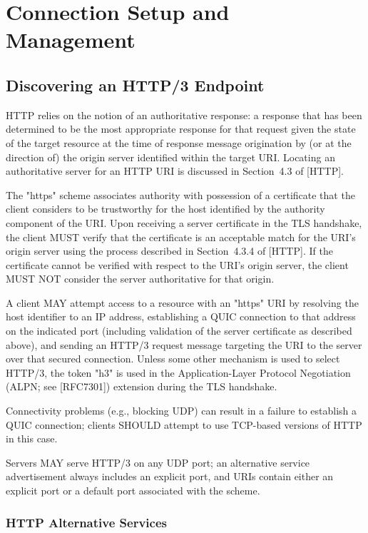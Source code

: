 \documentclass{article}
\begin{document}
\section{Connection Setup and Management}

\subsection{Discovering an HTTP/3 Endpoint}

HTTP relies on the notion of an authoritative response: a response that has been determined to be the most appropriate response for that request given the state of the target resource at the time of response message origination by (or at the direction of) the origin server identified within the target URI.  Locating an authoritative server for an HTTP URI is discussed in Section~4.3 of [HTTP].

The "https" scheme associates authority with possession of a certificate that the client considers to be trustworthy for the host identified by the authority component of the URI.  Upon receiving a server certificate in the TLS handshake, the client MUST verify that the certificate is an acceptable match for the URI's origin server using the process described in Section~4.3.4 of [HTTP].  If the certificate cannot be verified with respect to the URI's origin server, the client MUST NOT consider the server authoritative for that origin.

A client MAY attempt access to a resource with an "https" URI by resolving the host identifier to an IP address, establishing a QUIC connection to that address on the indicated port (including validation of the server certificate as described above), and sending an HTTP/3 request message targeting the URI to the server over that secured connection.  Unless some other mechanism is used to select HTTP/3, the token "h3" is used in the Application-Layer Protocol Negotiation (ALPN; see [RFC7301]) extension during the TLS handshake.

Connectivity problems (e.g., blocking UDP) can result in a failure to establish a QUIC connection; clients SHOULD attempt to use TCP-based versions of HTTP in this case.

Servers MAY serve HTTP/3 on any UDP port; an alternative service advertisement always includes an explicit port, and URIs contain either an explicit port or a default port associated with the scheme.

\subsubsection{HTTP Alternative Services}
\end{document}
